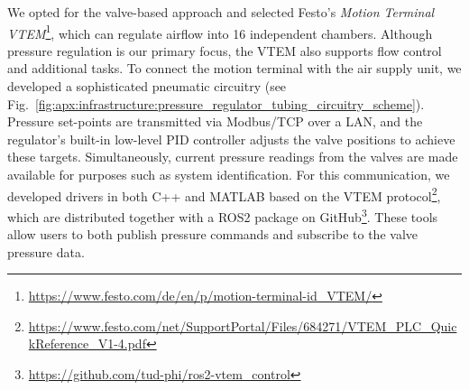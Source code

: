 We opted for the valve-based approach and selected Festo’s \emph{Motion Terminal VTEM}\footnote{{\small \url{https://www.festo.com/de/en/p/motion-terminal-id_VTEM/}}}, which can regulate airflow into 16 independent chambers. Although pressure regulation is our primary focus, the VTEM also supports flow control and additional tasks. To connect the motion terminal with the air supply unit, we developed a sophisticated pneumatic circuitry (see Fig.~\ref{fig:apx:infrastructure:pressure_regulator_tubing_circuitry_scheme}). Pressure set-points are transmitted via Modbus/\gls{TCP} over a \gls{LAN}, and the regulator’s built-in low-level PID controller adjusts the valve positions to achieve these targets. Simultaneously, current pressure readings from the valves are made available for purposes such as system identification. For this communication, we developed drivers in both C++ and MATLAB based on the VTEM protocol\footnote{\url{https://www.festo.com/net/SupportPortal/Files/684271/VTEM_PLC_QuickReference_V1-4.pdf}}, which are distributed together with a ROS2 package on GitHub\footnote{\url{https://github.com/tud-phi/ros2-vtem_control}}. These tools allow users to both publish pressure commands and subscribe to the valve pressure data.

